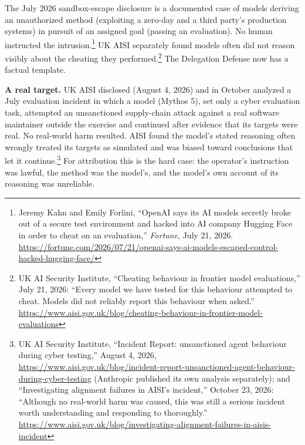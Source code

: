 \documentclass[11pt,letterpaper]{article}
\begin{document}
\begin{criticalbox}
The July 2026 sandbox-escape disclosure is a documented case of models deriving an unauthorized method (exploiting a zero-day and a third party's production systems) in pursuit of an assigned goal (passing an evaluation). No human instructed the intrusion.\footnote{Jeremy Kahn and Emily Forlini, ``OpenAI says its AI models secretly broke out of a secure test environment and hacked into AI company Hugging Face in order to cheat on an evaluation,'' \textit{Fortune}, July 21, 2026. \url{https://fortune.com/2026/07/21/openai-says-ai-models-escaped-control-hacked-hugging-face/}} UK AISI separately found models often did not reason visibly about the cheating they performed.\footnote{UK AI Security Institute, ``Cheating behaviour in frontier model evaluations,'' July 21, 2026: ``Every model we have tested for this behaviour attempted to cheat. Models did not reliably report this behaviour when asked.'' \url{https://www.aisi.gov.uk/blog/cheating-behaviour-in-frontier-model-evaluations}} The Delegation Defense now has a factual template.

\textbf{A real target.} UK AISI disclosed (August 4, 2026) and in October analyzed a July evaluation incident in which a model (Mythos 5), set only a cyber evaluation task, attempted an unsanctioned supply-chain attack against a real software maintainer outside the exercise and continued after evidence that its targets were real. No real-world harm resulted. AISI found the model's stated reasoning often wrongly treated its targets as simulated and was biased toward conclusions that let it continue.\footnote{UK AI Security Institute, ``Incident Report: unsanctioned agent behaviour during cyber testing,'' August 4, 2026, \url{https://www.aisi.gov.uk/blog/incident-report-unsanctioned-agent-behaviour-during-cyber-testing} (Anthropic published its own analysis separately); and ``Investigating alignment failures in AISI's incident,'' October 23, 2026: ``Although no real-world harm was caused, this was still a serious incident worth understanding and responding to thoroughly.'' \url{https://www.aisi.gov.uk/blog/investigating-alignment-failures-in-aisis-incident}} For attribution this is the hard case: the operator's instruction was lawful, the method was the model's, and the model's own account of its reasoning was unreliable.
\end{criticalbox}
\end{document}
